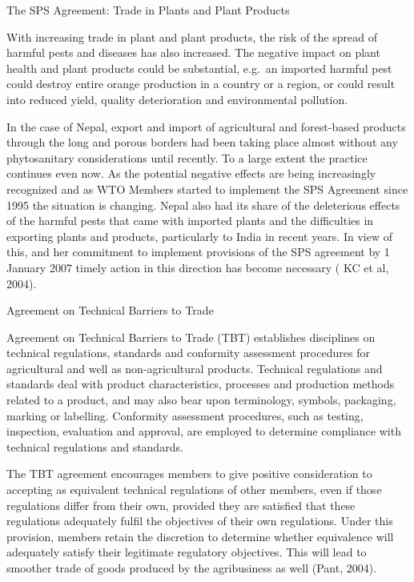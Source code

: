 \documentclass[
  openany]{book}
\begin{document}
The SPS Agreement: Trade in Plants and Plant Products

With increasing trade in plant and plant products, the risk of the spread of harmful pests and diseases has also increased. The negative impact on plant health and plant products could be substantial, e.g.~an imported harmful pest could destroy entire orange production in a country or a region, or could result into reduced yield, quality deterioration and environmental pollution.

In the case of Nepal, export and import of agricultural and forest-based products through the long and porous borders had been taking place almost without any phytosanitary considerations until recently. To a large extent the practice continues even now. As the potential negative effects are being increasingly recognized and as WTO Members started to implement the SPS Agreement since 1995 the situation is changing. Nepal also had its share of the deleterious effects of the harmful pests that came with imported plants and the difficulties in exporting plants and products, particularly to India in recent years. In view of this, and her commitment to implement provisions of the SPS agreement by 1 January 2007 timely action in this direction has become necessary ( KC et al, 2004).

Agreement on Technical Barriers to Trade

Agreement on Technical Barriers to Trade (TBT) establishes disciplines on technical regulations, standards and conformity assessment procedures for agricultural and well as non-agricultural products. Technical regulations and standards deal with product characteristics, processes and production methods related to a product, and may also bear upon terminology, symbols, packaging, marking or labelling. Conformity assessment procedures, such as testing, inspection, evaluation and approval, are employed to determine compliance with technical regulations and standards.

The TBT agreement encourages members to give positive consideration to accepting as equivalent technical regulations of other members, even if those regulations differ from their own, provided they are satisfied that these regulations adequately fulfil the objectives of their own regulations. Under this provision, members retain the discretion to determine whether equivalence will adequately satisfy their legitimate regulatory objectives. This will lead to smoother trade of goods produced by the agribusiness as well (Pant, 2004).
\end{document}
